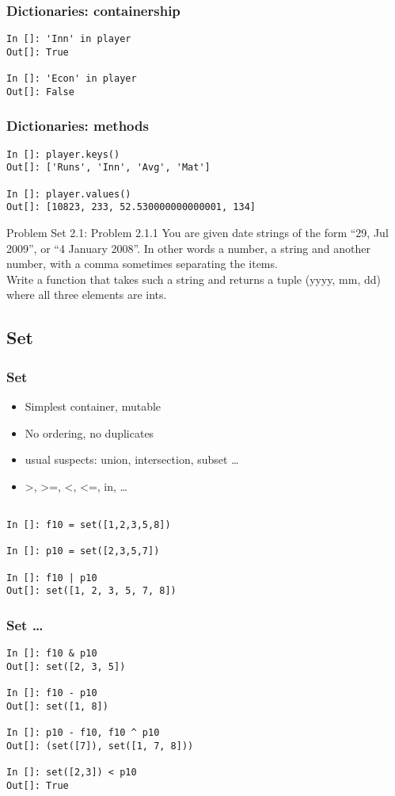 \documentclass[14pt,compress]{beamer}
\newcounter{time}
\begin{document}
\begin{frame}[fragile]
  \frametitle{Dictionaries: containership}
  \begin{lstlisting}
In []: 'Inn' in player
Out[]: True

In []: 'Econ' in player
Out[]: False
  \end{lstlisting}
\end{frame}

\begin{frame}[fragile]
  \frametitle{Dictionaries: methods}
  \begin{lstlisting}
In []: player.keys()
Out[]: ['Runs', 'Inn', 'Avg', 'Mat']

In []: player.values()
Out[]: [10823, 233, 52.530000000000001, 134]
  \end{lstlisting}
\end{frame}

\begin{frame} {Problem Set 2.1: Problem 2.1.1}
You are given date strings of the form ``29, Jul 2009'', or ``4 January 2008''. In other words a number, a string and another number, with a comma sometimes separating the items.\\Write a function that takes such a string and returns a tuple (yyyy, mm, dd) where all three elements are ints.
\end{frame}

\subsection{Set}
\begin{frame}[fragile]
  \frametitle{Set}
    \begin{itemize}
      \item Simplest container, mutable
      \item No ordering, no duplicates
      \item usual suspects: union, intersection, subset \ldots
      \item >, >=, <, <=, in, \ldots
    \end{itemize}
    \begin{lstlisting}

In []: f10 = set([1,2,3,5,8])

In []: p10 = set([2,3,5,7])

In []: f10 | p10
Out[]: set([1, 2, 3, 5, 7, 8])
\end{lstlisting}
\end{frame}

\begin{frame}[fragile]
  \frametitle{Set \ldots}
    \begin{lstlisting}
In []: f10 & p10
Out[]: set([2, 3, 5])

In []: f10 - p10
Out[]: set([1, 8])

In []: p10 - f10, f10 ^ p10
Out[]: (set([7]), set([1, 7, 8]))

In []: set([2,3]) < p10
Out[]: True
\end{lstlisting}
\end{frame}
\end{document}
